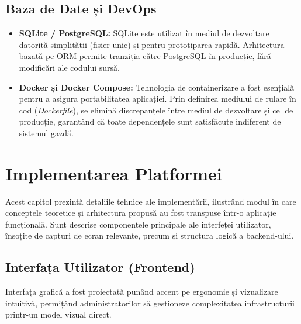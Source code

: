\documentclass[12pt,a4paper]{article}
\begin{document}
\subsection{Baza de Date și DevOps}
\begin{itemize}
    \item \textbf{SQLite / PostgreSQL:} SQLite este utilizat în mediul de dezvoltare datorită simplității (fișier unic) și pentru prototiparea rapidă. Arhitectura bazată pe ORM permite tranziția către PostgreSQL în producție, fără modificări ale codului sursă.
    \item \textbf{Docker și Docker Compose:} Tehnologia de containerizare a fost esențială pentru a asigura portabilitatea aplicației. Prin definirea mediului de rulare în cod (\textit{Dockerfile}), se elimină discrepanțele între mediul de dezvoltare și cel de producție, garantând că toate dependențele sunt satisfăcute indiferent de sistemul gazdă.
\end{itemize}

\newpage
\section{Implementarea Platformei}
\label{sec:implementare}

Acest capitol prezintă detaliile tehnice ale implementării, ilustrând modul în care conceptele teoretice și arhitectura propusă au fost transpuse într-o aplicație funcțională. Sunt descrise componentele principale ale interfeței utilizator, însoțite de capturi de ecran relevante, precum și structura logică a backend-ului.

\subsection{Interfața Utilizator (Frontend)}

Interfața grafică a fost proiectată punând accent pe ergonomie și vizualizare intuitivă, permițând administratorilor să gestioneze complexitatea infrastructurii printr-un model vizual direct.
\end{document}
